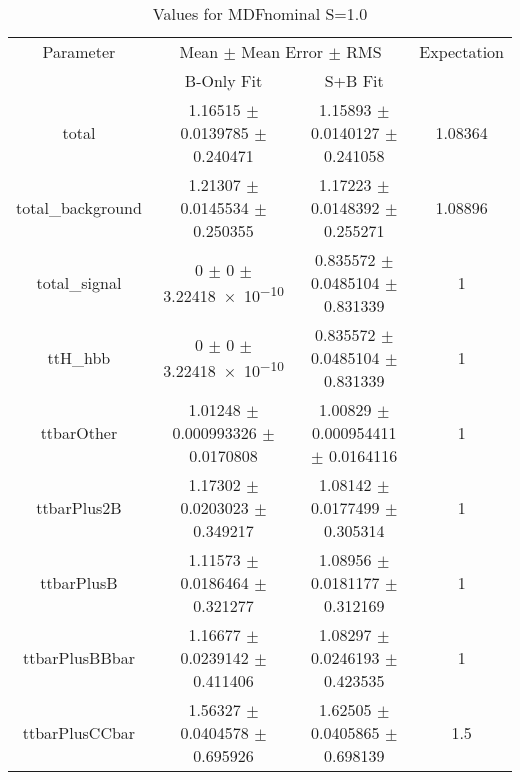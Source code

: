 \begin{table}
\centering
\caption{Values for MDFnominal S=1.0}
\begin{tabular}{cccc}
\toprule
Parameter & \multicolumn{2}{c}{Mean $\pm$ Mean Error $\pm$ RMS} & Expectation\\
 & B-Only Fit & S+B Fit & \\
\midrule
total & \num{1.16515} $\pm$ \num{0.0139785} $\pm$ \num{0.240471} & \num{1.15893} $\pm$ \num{0.0140127} $\pm$ \num{0.241058} & \num{1.08364}\\
total\_background & \num{1.21307} $\pm$ \num{0.0145534} $\pm$ \num{0.250355} & \num{1.17223} $\pm$ \num{0.0148392} $\pm$ \num{0.255271} & \num{1.08896}\\
total\_signal & \num{0} $\pm$ \num{0} $\pm$ \num{3.22418e-10} & \num{0.835572} $\pm$ \num{0.0485104} $\pm$ \num{0.831339} & \num{1}\\
ttH\_hbb & \num{0} $\pm$ \num{0} $\pm$ \num{3.22418e-10} & \num{0.835572} $\pm$ \num{0.0485104} $\pm$ \num{0.831339} & \num{1}\\
ttbarOther & \num{1.01248} $\pm$ \num{0.000993326} $\pm$ \num{0.0170808} & \num{1.00829} $\pm$ \num{0.000954411} $\pm$ \num{0.0164116} & \num{1}\\
ttbarPlus2B & \num{1.17302} $\pm$ \num{0.0203023} $\pm$ \num{0.349217} & \num{1.08142} $\pm$ \num{0.0177499} $\pm$ \num{0.305314} & \num{1}\\
ttbarPlusB & \num{1.11573} $\pm$ \num{0.0186464} $\pm$ \num{0.321277} & \num{1.08956} $\pm$ \num{0.0181177} $\pm$ \num{0.312169} & \num{1}\\
ttbarPlusBBbar & \num{1.16677} $\pm$ \num{0.0239142} $\pm$ \num{0.411406} & \num{1.08297} $\pm$ \num{0.0246193} $\pm$ \num{0.423535} & \num{1}\\
ttbarPlusCCbar & \num{1.56327} $\pm$ \num{0.0404578} $\pm$ \num{0.695926} & \num{1.62505} $\pm$ \num{0.0405865} $\pm$ \num{0.698139} & \num{1.5}\\
\bottomrule
\end{tabular}
\end{table}